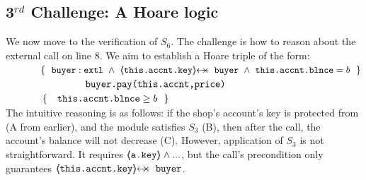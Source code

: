   
  \subsection{3$^{rd}$ Challenge:  A Hoare logic} %
 \label{sec:howThird}


 
 \vspace{.1cm}
 
We now move to the  verification of $S_6$. 
The challenge is how to reason  about the external call on line 8. %
% 
%
% 
We aim to establish a Hoare triple of the form:
 \\
$\strut \ \ \ \ \ \ \ \ \ \ \  \{\  \ { \external{\prg{buyer}}} \ \wedge\ {\protectedFrom {\prg{this.\myAccount.key}} {\prg{buyer}}\ \wedge\ {\prg{this.\myAccount.\balance}}= b    }\ \  \}$\\
$\strut \ \ \ \ \ \ \ \ \ \ \   \ \ \ \ \ \ \ \ \ \ \ \ {\ \prg{buyer.pay(this.accnt,price)}   \ } $\\
$\strut \ \ \ \ \ \ \ \ \ \ \  \{\  \ \  {\prg{this.\myAccount.\balance}} \geq  b \  \  \}$ 
\\
The intuitive reasoning is as follows: if the shop's account's key is protected from  (A from earlier), and the module satisfies $S_3$ (B), then after the call, the account's balance will not decrease (C).
%
However, application of $S_3$ is not straightforward. 
It requires ${\langle\!\!\langle \mbox{\normalfont{\texttt{a.key}}} \rangle\!\!\rangle} \wedge ...$,  but  the call's precondition only guarantees $\protectedFrom{\prg{this.\myAccount.key}}{\prg{buyer}}$. 


